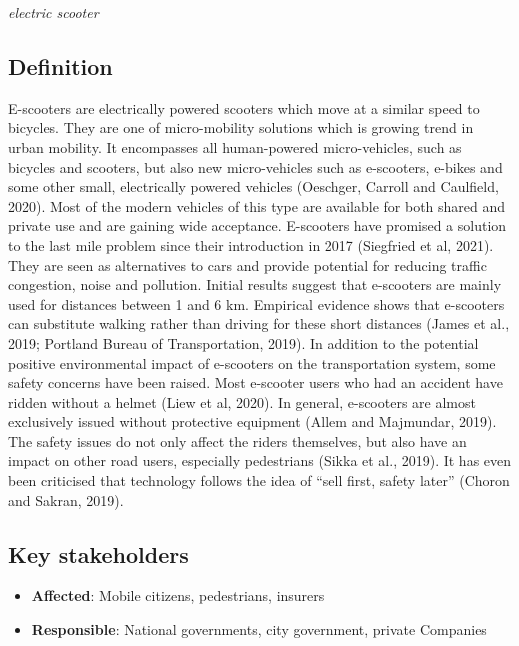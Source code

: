 \documentclass[
]{book}
\providecommand{\tightlist}{%
  \setlength{\itemsep}{0pt}\setlength{\parskip}{0pt}}
\begin{document}
\emph{electric scooter}

\hypertarget{definition-44}{%
\subsection*{Definition}\label{definition-44}}

E-scooters are electrically powered scooters which move at a similar speed to bicycles. They are one of micro-mobility solutions which is growing trend in urban mobility. It encompasses all human-powered micro-vehicles, such as bicycles and scooters, but also new micro-vehicles such as e-scooters, e-bikes and some other small, electrically powered vehicles (Oeschger, Carroll and Caulfield, 2020). Most of the modern vehicles of this type are available for both shared and private use and are gaining wide acceptance.
E-scooters have promised a solution to the last mile problem since their introduction in 2017 (Siegfried et al, 2021). They are seen as alternatives to cars and provide potential for reducing traffic congestion, noise and pollution. Initial results suggest that e-scooters are mainly used for distances between 1 and 6 km. Empirical evidence shows that e-scooters can substitute walking rather than driving for these short distances (James et al., 2019; Portland Bureau of Transportation, 2019). In addition to the potential positive environmental impact of e-scooters on the transportation system, some safety concerns have been raised. Most e-scooter users who had an accident have ridden without a helmet (Liew et al, 2020). In general, e-scooters are almost exclusively issued without protective equipment (Allem and Majmundar, 2019). The safety issues do not only affect the riders themselves, but also have an impact on other road users, especially pedestrians (Sikka et al., 2019). It has even been criticised that technology follows the idea of ``sell first, safety later'' (Choron and Sakran, 2019).

\hypertarget{key-stakeholders-44}{%
\subsection*{Key stakeholders}\label{key-stakeholders-44}}

\begin{itemize}
\tightlist
\item
  \textbf{Affected}: Mobile citizens, pedestrians, insurers
\item
  \textbf{Responsible}: National governments, city government, private Companies
\end{itemize}
\end{document}
